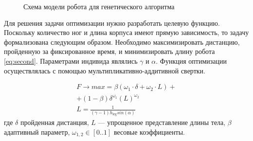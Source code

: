 \begin{figure}[H]
    \centering
    \caption{Схема модели робота для генетического алгоритма}
    \label{fig:best_gen_robot.jpg}
\end{figure}

Для решения задачи оптимизации нужно разработать целевую функцию. Поскольку количество ног и длина корпуса имеют прямую зависимость, то задачу формализована следующим образом. Необходимо максимизировать дистанцию, пройденную за фиксированное время, и минимизировать длину робота \eqref{eq:second}. Параметрами индивида являлись $\gamma$ и $\alpha$. Функция оптимизации осуществлялась с помощью мультипликативно-аддитивной свертки.

\begin{eqnarray}
    \label{eq:second}
    F \rightarrow max = \beta \left( {\omega}_{1} \cdot \delta + {\omega}_{2} \cdot L\right) + \\ \nonumber + (1 - \beta) {\delta}^{{\omega}_{1}} {\left( L\right)}^{{\omega}_{2}} \\
    L = \frac{1}{(\gamma - 1) h_{\text{leg}}sin(\alpha)}
\end{eqnarray}
где $\delta$ пройденная дистанция, $L$ --- упрощенное представление длины тела, $\beta$ адаптивный параметр, ${\omega}_{1,2} \in  [ 0..1 ] $ весовые коэффициенты.


